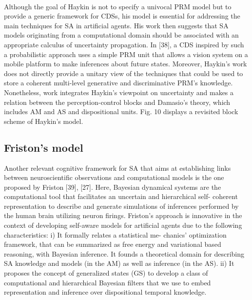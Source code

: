 \documentclass{article}
\begin{document}
		\paragraph{}Although the goal of Haykin is not to specify a univocal PRM model but to provide a generic framework for CDSs, his model is essential for addressing the main techniques for SA in artificial agents. His work then suggests that SA models originating from a computational domain should be associated with an appropriate calculus of uncertainty propagation. In \citet{regazzoni-2020-multi-sensorial-generative-and-descriptive-self-awareness-models-for-autonomous-systems}[38], a CDS inspired by such a probabilistic approach uses a simple PRM unit that allows a vision system on a mobile platform to make inferences about future states. Moreover, Haykin’s work does not directly provide a unitary view of the techniques that could be used to store a coherent multi-level generative and discriminative PRM’s knowledge. Nonetheless, \cite{regazzoni-2020-multi-sensorial-generative-and-descriptive-self-awareness-models-for-autonomous-systems} work
		integrates Haykin’s viewpoint on uncertainty and makes a relation between the perception-control blocks and Damasio’s
		theory, which includes AM and AS and dispositional units.
		\cite{regazzoni-2020-multi-sensorial-generative-and-descriptive-self-awareness-models-for-autonomous-systems}Fig. 10 displays a revisited block scheme of Haykin’s model.
		
		\subsection{Friston’s model}
		Another relevant cognitive framework for SA that aims at
		establishing links between neuroscientific observations and
		computational models is the one proposed by Friston \citet{regazzoni-2020-multi-sensorial-generative-and-descriptive-self-awareness-models-for-autonomous-systems}[39],
		\citet{regazzoni-2020-multi-sensorial-generative-and-descriptive-self-awareness-models-for-autonomous-systems}[27]. Here, Bayesian dynamical systems are the computational
		tool that facilitates an uncertain and hierarchical self-
		coherent representation to describe and generate simulations
		of inferences performed by the human brain utilizing neuron
		firings. Friston’s approach is innovative in the context of
		developing self-aware models for artificial agents due to the
		following characteristics: i) It formally relates a statistical me-
		chanics’ optimization framework, that can be summarized as
		free energy and variational based reasoning, with Bayesian
		inference. It founds a theoretical domain for describing SA
		knowledge and models (in the AM) as well as inference (in
		the AS). ii) It proposes the concept of generalized states (GS)
		to develop a class of computational and hierarchical Bayesian
		filters that we use to embed representation and inference over
		dispositional temporal knowledge.
\end{document}
